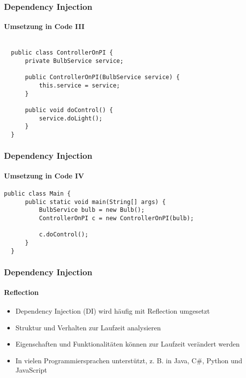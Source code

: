 \begin{frame}[fragile]
  \frametitle{Dependency Injection}
  \framesubtitle{Umsetzung in Code III}
  \begin{minipage}{\textwidth}
  \begin{lstlisting}[caption={Dependency},captionpos=b,label={lst:di-dependency}]

  public class ControllerOnPI {
      private BulbService service;
      
      public ControllerOnPI(BulbService service) {
          this.service = service;
      }
      
      public void doControl() {
          service.doLight();
      }
  }
  \end{lstlisting}
  \end{minipage}
\end{frame}

\begin{frame}[fragile]
  \frametitle{Dependency Injection}
  \framesubtitle{Umsetzung in Code IV}
  \noindent\begin{minipage}{\textwidth}
  \begin{lstlisting}[caption={Die DI Main},captionpos=b,label={lst:di-main}]
  public class Main {
      public static void main(String[] args) {
          BulbService bulb = new Bulb();
          ControllerOnPI c = new ControllerOnPI(bulb);
          
          c.doControl();
      }
  }
  \end{lstlisting}
  \end{minipage}
\end{frame}

\begin{frame}
  \frametitle{Dependency Injection}
  \framesubtitle{Reflection}
  \begin{itemize}
    \item Dependency Injection (DI) wird häufig mit Reflection umgesetzt
    \item Struktur und Verhalten zur Laufzeit analysieren
    \item Eigenschaften und Funktionalitäten können zur Laufzeit verändert werden
    \item In vielen Programmiersprachen unterstützt, z. B. in Java, C\#, Python und JavaScript
  \end{itemize}
\end{frame}